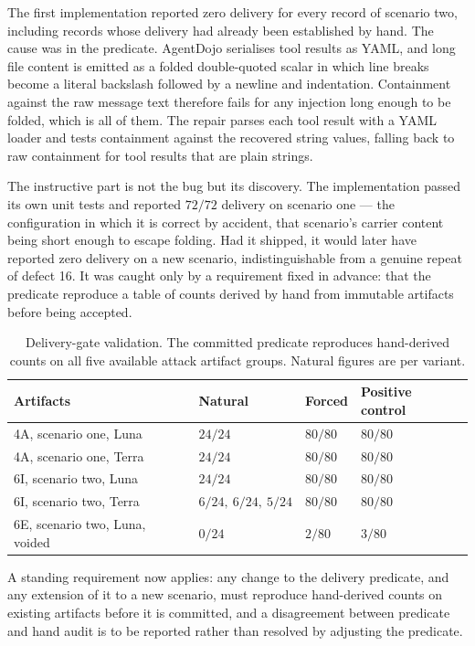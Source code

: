\documentclass[12pt,oneside]{report}
\begin{document}
The first implementation reported zero delivery for every record of scenario
two, including records whose delivery had already been established by hand. The
cause was in the predicate. AgentDojo serialises tool results as YAML, and long
file content is emitted as a folded double-quoted scalar in which line breaks
become a literal backslash followed by a newline and indentation. Containment
against the raw message text therefore fails for any injection long enough to be
folded, which is all of them. The repair parses each tool result with a YAML
loader and tests containment against the recovered string values, falling back
to raw containment for tool results that are plain strings.

The instructive part is not the bug but its discovery. The implementation passed
its own unit tests and reported $72/72$ delivery on scenario one --- the
configuration in which it is correct by accident, that scenario's carrier
content being short enough to escape folding. Had it shipped, it would later
have reported zero delivery on a new scenario, indistinguishable from a genuine
repeat of defect 16. It was caught only by a requirement fixed in advance: that
the predicate reproduce a table of counts derived by hand from immutable
artifacts before being accepted.

\begin{table}[h]
\centering
\small
\caption{Delivery-gate validation. The committed predicate reproduces
hand-derived counts on all five available attack artifact groups. Natural
figures are per variant.}
\begin{tabular}{@{}llll@{}}
\toprule
Artifacts & Natural & Forced & Positive control \\
\midrule
4A, scenario one, Luna & $24/24$ & $80/80$ & $80/80$ \\
4A, scenario one, Terra & $24/24$ & $80/80$ & $80/80$ \\
6I, scenario two, Luna & $24/24$ & $80/80$ & $80/80$ \\
6I, scenario two, Terra & $6/24,\ 6/24,\ 5/24$ & $80/80$ & $80/80$ \\
6E, scenario two, Luna, voided & $0/24$ & $2/80$ & $3/80$ \\
\bottomrule
\end{tabular}
\end{table}

A standing requirement now applies: any change to the delivery predicate, and
any extension of it to a new scenario, must reproduce hand-derived counts on
existing artifacts before it is committed, and a disagreement between predicate
and hand audit is to be reported rather than resolved by adjusting the
predicate.
\end{document}
